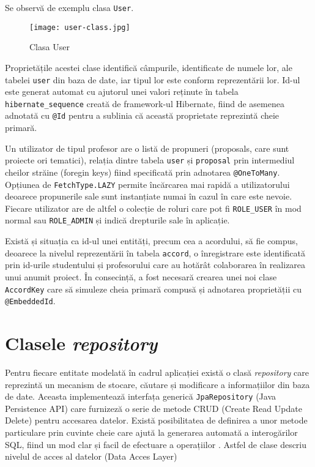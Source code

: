 Se observă de exemplu clasa \texttt{User}.

\begin{figure}[H]
	\centering
	\texttt{[image: user-class.jpg]}
	\caption{Clasa User}
\end{figure}

Proprietățile acestei clase identifică câmpurile, identificate de numele lor, ale tabelei \texttt{user} din baza de date, iar tipul lor este conform reprezentării lor. Id-ul este generat automat cu ajutorul unei valori reținute în tabela \texttt{hibernate\_sequence} creată de framework-ul Hibernate, fiind de asemenea adnotată cu \texttt{@Id} pentru a sublinia că această proprietate reprezintă cheie primară.

Un utilizator de tipul profesor are o listă de propuneri (proposals, care sunt proiecte ori tematici), relația dintre tabela \texttt{user} și \texttt{proposal} prin intermediul cheilor străine (foregin keys) fiind specificată prin adnotarea \texttt{@OneToMany}. Opțiunea de \texttt{FetchType.LAZY} permite încărcarea mai rapidă a utilizatorului deoarece propunerile sale sunt instanțiate numai în cazul în care este nevoie. Fiecare utilizator are de altfel o colecție de roluri care pot fi \texttt{ROLE\_USER} în mod normal sau \texttt{ROLE\_ADMIN} și indică drepturile sale în aplicație.

Există și situația ca id-ul unei entități, precum cea a acordului, să fie compus, deoarece la nivelul reprezentării în tabela \texttt{accord}, o înregistrare este identificată prin id-urile studentului și profesorului care au hotărât colaborarea în realizarea unui anumit proiect. În consecință, a fost necesară crearea unei noi clase \texttt{AccordKey} care să simuleze cheia primară compusă și adnotarea proprietății cu \texttt{@EmbeddedId}.

\section{Clasele \textit{repository}}

Pentru fiecare entitate modelată în cadrul aplicației există o clasă \textit{repository} care reprezintă un mecanism de stocare, căutare și modificare a informațiilor din baza de date. Aceasta implementează interfața generică \texttt{JpaRepository} (Java Persistence API) care furnizeză o serie de metode CRUD (Create Read Update Delete) pentru accesarea datelor. Există posibilitatea de definirea a unor metode particulare prin cuvinte cheie care ajută la generarea automată a interogărilor SQL, fiind un mod clar și facil de efectuare a operațiilor \cite{jpa-repository}. Astfel de clase descriu nivelul de acces al datelor (Data Acces Layer)

